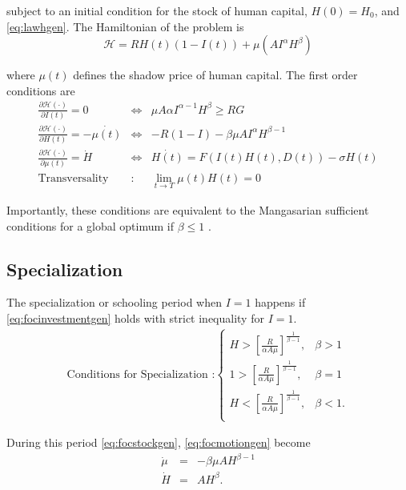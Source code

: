 \noindent subject to an initial condition for the stock of human capital, $H(0) = H_{0}$, and \eqref{eq:lawhgen}. The Hamiltonian of the problem is
\begin{equation}
\mathcal{H} = RH(t) \left(1 - I(t) \right) + \mu \left( A I^{\alpha} H^{\beta} \right)
\end{equation} 

where $\mu(t)$ defines the shadow price of human capital. The first order conditions are
\begin{eqnarray}
\frac{\partial \mathcal{H} (\cdot)}{\partial I(t)} = 0 &\Leftrightarrow& \mu A \alpha I^{\alpha - 1} H^{\beta} \geq RG \label{eq:focinvestmentgen} \\
\frac{\partial \mathcal{H} (\cdot)}{\partial H(t)} = - \dot{\mu(t)} &\Leftrightarrow& -R(1 - I) - \beta \mu A I^{\alpha} H^{\beta -1} \label{eq:focstockgen} \\ 
\frac{\partial \mathcal{H} (\cdot)}{\partial \mu(t)} = \dot{H} &\Leftrightarrow& \dot{H(t)} = F \left( I(t) H(t), D(t) \right) - \sigma H(t) \label{eq:focmotiongen} \\
\text{Transversality} &:& \lim_{t \rightarrow T} \mu(t) H(t) = 0 \label{eq:foctransversalitygen}
\end{eqnarray}

Importantly, these conditions are equivalent to the Mangasarian sufficient conditions for a global optimum if $\beta \leq 1$ \citep[see][]{mangasarian1966sufficient}.

\subsection{Specialization}
The specialization or schooling period when $I = 1$ happens if
\eqref{eq:focinvestmentgen} holds with strict inequality for $I=1$.
\begin{eqnarray}
\text{Conditions for Specialization :}
\begin{cases}
H > \left[ \frac{R}{\alpha A \mu} \right]^{\frac{1}{\beta - 1}}, & \beta > 1 \\
1 > \left[ \frac{R}{\alpha A \mu} \right]^{\frac{1}{\beta - 1}}, & \beta = 1 \\
H < \left[ \frac{R}{\alpha A \mu} \right]^{\frac{1}{\beta - 1}}, & \beta < 1. \\
\end{cases}
\end{eqnarray}

\noindent During this period \eqref{eq:focstockgen}, \eqref{eq:focmotiongen} become 
\begin{eqnarray}
\dot{\mu} &=& - \beta \mu A H^{\beta - 1} \label{eq:focstockgenspe} \\
\dot{H}  &=& A H^{\beta}. \label{eq:focmotiongenspe}\\
\end{eqnarray}

